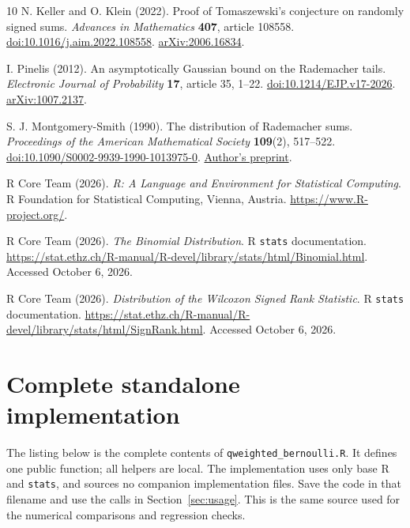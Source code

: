 \documentclass[11pt,letterpaper]{article}
\numberwithin{equation}{section}
\theoremstyle{definition}
\theoremstyle{remark}
\begin{document}
\begin{thebibliography}{10}
N. Keller and O. Klein (2022).
Proof of Tomaszewski's conjecture on randomly signed sums.
\emph{Advances in Mathematics} \textbf{407}, article 108558.
\href{https://doi.org/10.1016/j.aim.2022.108558}
{doi:10.1016/j.aim.2022.108558}.
\href{https://arxiv.org/abs/2006.16834}{arXiv:2006.16834}.

I. Pinelis (2012).
An asymptotically Gaussian bound on the Rademacher tails.
\emph{Electronic Journal of Probability} \textbf{17}, article 35, 1--22.
\href{https://doi.org/10.1214/EJP.v17-2026}{doi:10.1214/EJP.v17-2026}.
\href{https://arxiv.org/abs/1007.2137}{arXiv:1007.2137}.

S. J. Montgomery-Smith (1990).
The distribution of Rademacher sums.
\emph{Proceedings of the American Mathematical Society}
\textbf{109}(2), 517--522.
\href{https://doi.org/10.1090/S0002-9939-1990-1013975-0}
{doi:10.1090/S0002-9939-1990-1013975-0}.
\href{https://stephenmontgomerysmith.github.io/preprints/tail.pdf}
{Author's preprint}.

R Core Team (2026).
\emph{R: A Language and Environment for Statistical Computing}.
R Foundation for Statistical Computing, Vienna, Austria.
\url{https://www.R-project.org/}.

R Core Team (2026).
\emph{The Binomial Distribution}. R \texttt{stats} documentation.
\url{https://stat.ethz.ch/R-manual/R-devel/library/stats/html/Binomial.html}.
Accessed October 6, 2026.

R Core Team (2026).
\emph{Distribution of the Wilcoxon Signed Rank Statistic}.
R \texttt{stats} documentation.
\url{https://stat.ethz.ch/R-manual/R-devel/library/stats/html/SignRank.html}.
Accessed October 6, 2026.

\end{thebibliography}

\clearpage
\appendix
\section{Complete standalone implementation}
\label{sec:complete-function}

The listing below is the complete contents of
\texttt{qweighted\_bernoulli.R}. It defines one public function; all helpers
are local. The implementation uses only base R and \texttt{stats}, and
sources no companion implementation files. Save the code in that filename
and use the calls in Section~\ref{sec:usage}. This is the same source used
for the numerical comparisons and regression checks.
\end{document}
